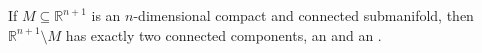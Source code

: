 \begin{theorem}
\label{thm:jordan_brouwer}
If $M \subseteq \mathbb{R}^{n+1}$ is an $n$-dimensional compact and connected submanifold,
then $\mathbb{R}^{n+1}\setminus M$ has exactly two connected components, an
 and an .
\end{theorem}

